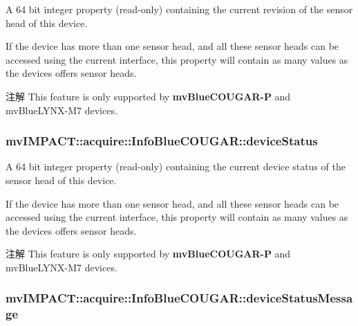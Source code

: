 A 64 bit integer property {\bfseries }(read-\/only) containing the current revision of the sensor head of this device. 

If the device has more than one sensor head, and all these sensor heads can be accessed using the current interface, this property will contain as many values as the devices offers sensor heads.

\begin{DoxyNote}{注解}
This feature is only supported by {\bfseries mv\+Blue\+C\+O\+U\+G\+A\+R-\/\+P} and mv\+Blue\+L\+Y\+N\+X-\/\+M7 devices. 
\end{DoxyNote}
\hypertarget{classmv_i_m_p_a_c_t_1_1acquire_1_1_info_blue_c_o_u_g_a_r_a9a33e916adfcde0222bc2e376f437c46}{
\subsubsection[{device\+Status}]{ mv\+I\+M\+P\+A\+C\+T\+::acquire\+::\+Info\+Blue\+C\+O\+U\+G\+A\+R\+::device\+Status}}\label{classmv_i_m_p_a_c_t_1_1acquire_1_1_info_blue_c_o_u_g_a_r_a9a33e916adfcde0222bc2e376f437c46}


A 64 bit integer property {\bfseries }(read-\/only) containing the current device status of the sensor head of this device. 

If the device has more than one sensor head, and all these sensor heads can be accessed using the current interface, this property will contain as many values as the devices offers sensor heads.

\begin{DoxyNote}{注解}
This feature is only supported by {\bfseries mv\+Blue\+C\+O\+U\+G\+A\+R-\/\+P} and mv\+Blue\+L\+Y\+N\+X-\/\+M7 devices. 
\end{DoxyNote}
\hypertarget{classmv_i_m_p_a_c_t_1_1acquire_1_1_info_blue_c_o_u_g_a_r_a740b0124c346b87d8913826bc97d82e6}{
\subsubsection[{device\+Status\+Message}]{ mv\+I\+M\+P\+A\+C\+T\+::acquire\+::\+Info\+Blue\+C\+O\+U\+G\+A\+R\+::device\+Status\+Message}}\label{classmv_i_m_p_a_c_t_1_1acquire_1_1_info_blue_c_o_u_g_a_r_a740b0124c346b87d8913826bc97d82e6}


